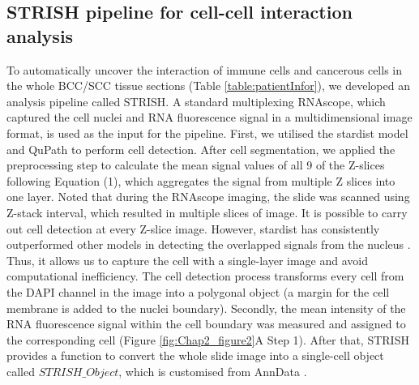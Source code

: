 \subsection{STRISH pipeline for cell-cell interaction analysis}
\label{Sec:2.3_validation} 
To automatically uncover the interaction of immune cells and cancerous cells in the whole BCC/SCC tissue sections (Table \ref{table:patientInfor}), we developed an analysis pipeline called STRISH. A standard multiplexing RNAscope, which captured the cell nuclei and RNA fluorescence signal in a multidimensional image format, is used as the input for the pipeline. First, we utilised the stardist \cite{schmidt2018cell} model and QuPath \cite{bankhead2017qupath} to perform cell detection. After cell segmentation, we applied the preprocessing step to calculate the mean signal values of all 9 of the Z-slices following Equation (1), which aggregates the signal from multiple Z slices into one layer. Noted that during the RNAscope imaging, the slide was scanned using Z-stack interval, which resulted in multiple slices of image. It is possible to carry out cell detection at every Z-slice image. However, stardist has consistently outperformed other models in detecting the overlapped signals from the nucleus \cite{schmidt2018cell}. Thus, it allows us to capture the cell with a single-layer image and avoid computational inefficiency. The cell detection process transforms every cell from the DAPI channel in the image into a polygonal object (a margin for the cell membrane is added to the nuclei boundary). Secondly, the mean intensity of the RNA fluorescence signal within the cell boundary was measured and assigned to the corresponding cell (Figure \ref{fig:Chap2_figure2}A Step 1). After that, STRISH provides a function to convert the whole slide image into a single-cell object called $STRISH\_Object$, which is customised from AnnData \cite{wolf2018scanpy}. 

